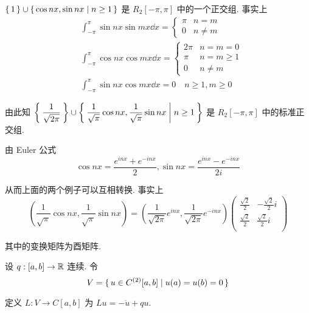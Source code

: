 \begin{example}
    $\set{1}\cup\set{\cos nx,\sin nx|n\ge 1}$ 是 $R_2[-\pi,\pi]$ 中的一个正交组. 事实上
$$
\begin{aligned}
    &\int_{-\pi}^\pi\sin nx\sin mx\dd x=\begin{cases}
        \pi & n=m\\
        0 & n\ne m
    \end{cases}\\
    &\int_{-\pi}^\pi\cos nx\cos mx\dd x=\begin{cases}
        2\pi & n=m=0\\
        \pi & n=m\ge 1\\
        0 & n\ne m
    \end{cases}\\
    &\int_{-\pi}^{\pi}\sin{nx}\cos{mx}\dd x=0\quad n\ge 1,m\ge 0
\end{aligned}
$$

    由此知 $\displaystyle\Set{\frac{1}{\sqrt{2\pi}}}\cup\Set{\frac{1}{\sqrt{\pi}}\cos nx,\frac{1}{\sqrt{\pi}}\sin nx|n\ge 1}$ 是 $R_2[-\pi,\pi]$ 中的标准正交组.
\end{example}

\begin{hint}
    由 Euler 公式
$$
\cos nx=\frac{e^{inx}+e^{-inx}}{2},\sin nx=\frac{e^{inx}-e^{-inx}}{2i}
$$

    从而上面的两个例子可以互相转换. 事实上
$$
\left(\frac{1}{\sqrt{\pi}}\cos nx,\frac{1}{\sqrt{\pi}}\sin nx\right)=\left(\frac{1}{\sqrt{2\pi}}e^{inx},\frac{1}{\sqrt{2\pi}}e^{-inx}\right)\begin{pmatrix}
    \frac{\sqrt{2}}{2} & -\frac{\sqrt{2}}{2}i\\
    \frac{\sqrt{2}}{2} & \frac{\sqrt{2}}{2}i\\
\end{pmatrix}
$$

    其中的变换矩阵为酉矩阵.
\end{hint}

\begin{example}
    设 $q:[a,b]\to\mathbb{R}$ 连续. 令
$$
V=\set{u\in C^{(2)}[a,b]|u(a)=u(b)=0}
$$

    定义 $L:V\to C[a,b]$ 为 $Lu=-\ddot{u}+qu$.
\end{example}


